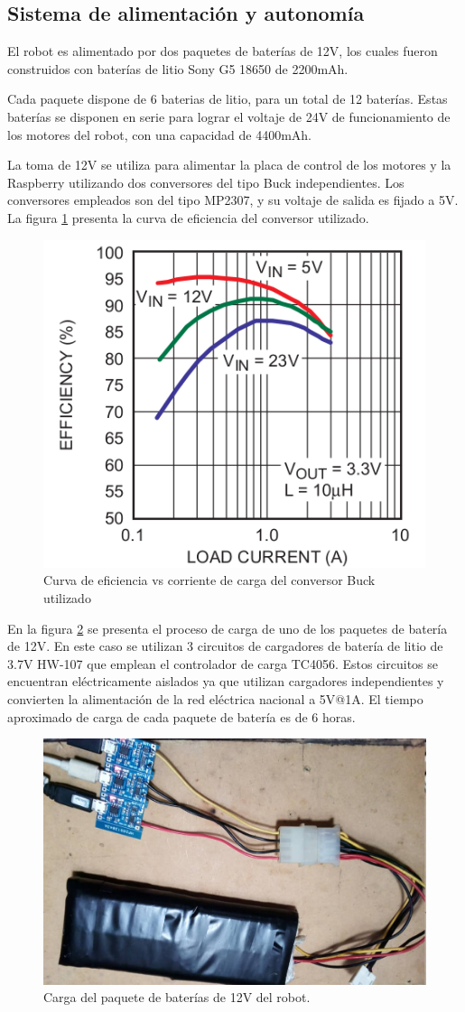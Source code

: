 \subsection{Sistema de alimentación y autonomía}

El robot es alimentado por dos paquetes de baterías de 12V, los cuales fueron construidos con baterías de litio Sony G5 18650 de 2200mAh.

Cada paquete dispone de 6 baterias de litio, para un total de 12 baterías.  Estas baterías se disponen en serie para lograr el voltaje de 24V de funcionamiento de los motores del robot, con una capacidad de 4400mAh. 

La toma de 12V se utiliza para alimentar la placa de control de los motores y la Raspberry utilizando dos conversores del tipo Buck independientes. Los conversores empleados son del tipo MP2307, y su voltaje de salida es fijado a  5V. La figura \ref{imagen:BuckCurva} presenta la curva de eficiencia del conversor utilizado.


\begin{figure}[H]
	\centering	
	\includegraphics[width=0.5\linewidth]{imagenes/prototipo/Buck}
	\caption{Curva de eficiencia vs corriente de carga del conversor Buck utilizado}
	\label{imagen:BuckCurva}
\end{figure}


En la figura \ref{imagen:Bateria} se presenta el proceso de carga de uno de los paquetes de batería de 12V. En este caso se utilizan 3 circuitos de cargadores de batería de litio de 3.7V HW-107 que emplean el controlador de carga TC4056. Estos circuitos se encuentran eléctricamente aislados ya que utilizan cargadores independientes y convierten la alimentación de la red eléctrica nacional a 5V@1A. El tiempo aproximado de carga de cada paquete de batería es de 6 horas.

\begin{figure}[H]
	\centering	
	\includegraphics[width=0.7\linewidth]{imagenes/prototipo/Bateria}
	\caption{Carga del paquete de baterías de 12V del robot.}
	\label{imagen:Bateria}
\end{figure}

